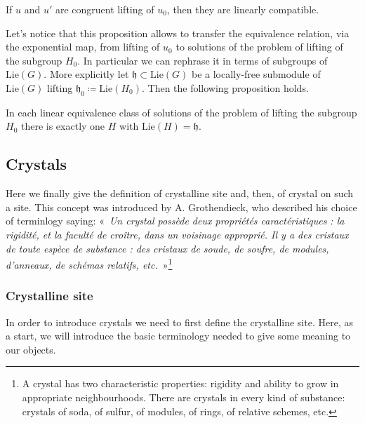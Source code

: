 \begin{lem}\label{lem:CongruentLinComp}
	If $u$ and $u'$ are congruent lifting of $u_0$, then
	they are linearly compatible.
\end{lem} 


\begin{rem}[]
	Let's notice that this proposition allows to
	transfer the equivalence relation, via the exponential map,
	from lifting of $u_0$ to solutions of the problem of lifting
	of the subgroup $H_0$.
	In particular we can rephrase it in terms of subgroups
	of $\mathrm{Lie}(G)$. More explicitly
	let $\mathfrak{h} \subset \mathrm{Lie}(G)$ be a locally-free
	submodule of $\mathrm{Lie}(G)$ lifting
	$\mathfrak{h}_0 \coloneqq \mathrm{Lie}(H_0)$.
	Then the following proposition holds.
\end{rem}


\begin{prop}\label{prop:equivClassFiltration}
	In each linear equivalence class of solutions of
	the problem of lifting the subgroup $H_0$
	there is exactly one $H$ with 
	$\mathrm{Lie}(H) = \mathfrak{h}$.
\end{prop}



\subsection{Crystals}
Here we finally give the definition of crystalline site and, then, of
crystal on such a site.
This concept was introduced by A. Grothendieck, 
who described his choice of terminlogy saying:
«~{\em Un crystal possède deux propriétés caractéristiques : la rigidité, 
et la faculté de croître, dans un voisinage approprié. 
Il y a des cristaux de toute espèce de substance : des cristaux de soude, 
de soufre, de modules, d'anneaux, de schémas relatifs, etc.}~»\footnote{A
crystal has two characteristic properties: rigidity and ability to grow
in appropriate neighbourhoods.
There are crystals in every kind of substance: crystals of soda, of sulfur,
of modules, of rings, of relative schemes, etc.}



\subsubsection{Crystalline site}
In order to introduce crystals we need to first define the crystalline site.
Here, as a start, we will introduce the basic terminology needed to give
some meaning to our objects.



